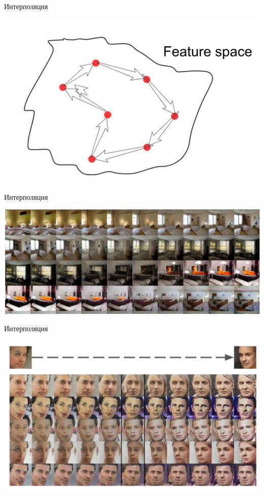 \documentclass[notes,12pt, aspectratio=169]{beamer}
\begin{document}
\begin{frame}{Интерполяция}
\begin{center}
	\centering	\includegraphics[width=.7\linewidth]{latent_space.png}
\end{center}
\end{frame}

\begin{frame}{Интерполяция}
\begin{center}
\centering	\includegraphics[width=.9\linewidth]{inter1.png}
\end{center}
\end{frame}

\begin{frame}{Интерполяция}
\begin{center}
\centering	\includegraphics[width=.9\linewidth]{inter2.png}
\end{center}
\end{frame}
\end{document}
